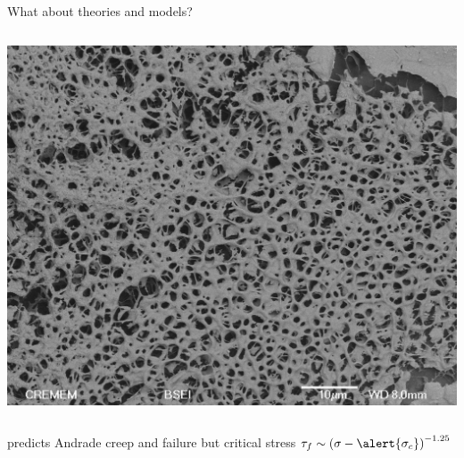 \begin{frame}{What about theories and models?}
\begin{columns}
\includegraphics[width=\textwidth, clip=true, trim=0 0 0 10cm]{MEB_cas4_gdl1_22}
\end{columns}
predicts Andrade creep and failure \alert{but} critical stress $\tau_f\sim\left(\sigma-\alert{\sigma_c}\right)^{-1.25}$
\end{frame}


